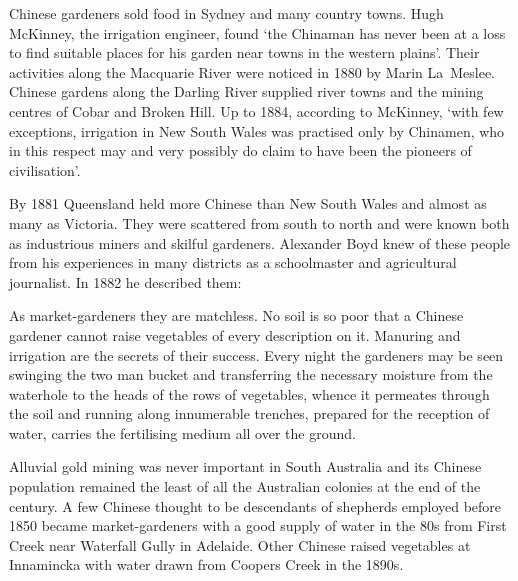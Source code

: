 Chinese gardeners sold food in Sydney  and many
country towns. Hugh McKinney,  the irrigation
engineer, found `the Chinaman has nev\-er been at a loss to find
suitable places for his garden near towns in the western plains'.
Their activities along the Macquarie River 
were noticed in 1880 by Marin La~Meslee.  
Chinese gardens along the Darling River  supplied
river towns and the mining centres of Cobar  and
Broken Hill.  Up to 1884, according to
McKinney, `with few exceptions, irrigation in New South Wales was
practised only by Chinamen, who in this respect may and very possibly
do claim to have been the pioneers of civilisation'.

By 1881 Queensland  held more Chinese
 than New South Wales and almost as many as Victoria.
They were scattered from south to north and were known both as
industrious miners and skilful gardeners.  Al\-exander Boyd
 knew of these people from his experiences in many
districts as a schoolmaster and agricultural
journalist.  In 1882 he described them:
\begin{Quote}
	As market-gardeners they are matchless.  No soil is so poor
	that a Chinese gardener cannot raise vegetables of every
	description on it.  Manuring and irrigation are the secrets of
	their success.  Every night the gardeners may be seen swinging
	the two man bucket and transferring the necessary moisture
	from the waterhole to the heads of the rows of vegetables,
	whence it permeates through the soil and running along
	innumerable trenches, prepared for the reception of water,
	carries the fertilising medium all over the
	ground.
\end{Quote}

Alluvial gold mining was never important in South Australia
 and its Chinese  population
remained the least of all the Australian colonies at the end of the
century.  A few Chinese thought to be descendants of shepherds
employed before 1850 became market-gardeners with a good supply of
water in the 80s from First Creek  near Waterfall
Gully  in Adelaide. 
Other Chinese raised vegetables at Innamincka 
with water drawn from Coopers Creek  in the
1890s.

